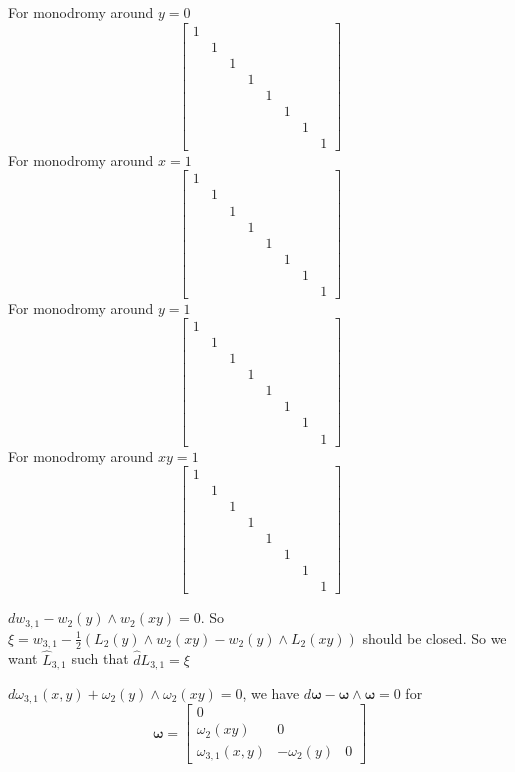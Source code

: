 \documentclass[main]{subfiles}
\begin{document}
For monodromy around $y=0$
\[\begin{bmatrix}
1&&&&&&&\\
&1&&&&&&\\
&&1&&&&&\\
&&&1&&&&\\
&&&&1&&&\\
&&&&&1&&\\
&&&&&&1&\\
&&&&&&&1
\end{bmatrix}\]
For monodromy around $x=1$
\[\begin{bmatrix}
1&&&&&&&\\
&1&&&&&&\\
&&1&&&&&\\
&&&1&&&&\\
&&&&1&&&\\
&&&&&1&&\\
&&&&&&1&\\
&&&&&&&1
\end{bmatrix}\]
For monodromy around $y=1$
\[\begin{bmatrix}
1&&&&&&&\\
&1&&&&&&\\
&&1&&&&&\\
&&&1&&&&\\
&&&&1&&&\\
&&&&&1&&\\
&&&&&&1&\\
&&&&&&&1
\end{bmatrix}\]
For monodromy around $xy=1$
\[\begin{bmatrix}
1&&&&&&&\\
&1&&&&&&\\
&&1&&&&&\\
&&&1&&&&\\
&&&&1&&&\\
&&&&&1&&\\
&&&&&&1&\\
&&&&&&&1
\end{bmatrix}\]

$dw_{3,1}-w_2(y)\wedge w_2(xy)=0$. So $\xi=w_{3,1}-\frac{1}{2}(L_2(y)\wedge w_2(xy)-w_2(y)\wedge L_2(xy))$ should be closed. So we want $\widehat L_{3,1}$ such that $\widehat dL_{3,1}=\xi$

$d\omega_{3,1}(x,y)+\omega_2(y)\wedge\omega_2(xy)=0$, we have $d\bm{\omega}-\bm{\omega}\wedge\bm{\omega}=0$ for
\[\bm{\omega}=\begin{bmatrix}
0\\
\omega_2(xy)&0\\
\omega_{3,1}(x,y)&-\omega_2(y)&0
\end{bmatrix}\]
\end{document}
